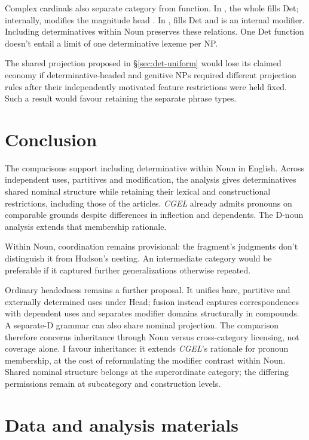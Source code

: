 \documentclass[12pt]{article}
\begin{document}
Complex cardinals also separate category from function. In , the whole  fills Det; internally,  modifies the magnitude head  \citep[§4]{reynolds2026numerals}. In ,  fills Det and  is an internal modifier. Including determinatives within Noun preserves these relations. One Det function doesn't entail a limit of one determinative lexeme per NP.

The shared projection proposed in §\ref{sec:det-uniform} would lose its claimed economy if determinative-headed and genitive NPs required different projection rules after their independently motivated feature restrictions were held fixed. Such a result would favour retaining the separate phrase types.

\section{Conclusion}\label{sec:conclusion}

The comparisons support including determinative within Noun in English. Across independent uses, partitives and modification, the analysis gives determinatives shared nominal structure while retaining their lexical and constructional restrictions, including those of the articles. \textit{CGEL} already admits pronouns on comparable grounds despite differences in inflection and dependents. The D-noun analysis extends that membership rationale.

Within Noun, coordination remains provisional: the fragment's judgments don't distinguish it from Hudson's nesting. An intermediate category would be preferable if it captured further generalizations otherwise repeated.

Ordinary headedness remains a further proposal. It unifies bare, partitive and externally determined uses under Head; fusion instead captures correspondences with dependent uses and separates modifier domains structurally in compounds. A separate-D grammar can also share nominal projection. The comparison therefore concerns inheritance through Noun versus cross-category licensing, not coverage alone. I favour inheritance: it extends \textit{CGEL}'s rationale for pronoun membership, at the cost of reformulating the modifier contrast within Noun. Shared nominal structure belongs at the superordinate category; the differing permissions remain at subcategory and construction levels.

\section*{Data and analysis materials}
\end{document}
